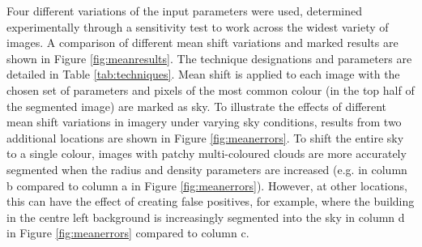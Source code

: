 \documentclass[final,3p,times,authoryear]{elsarticle}
\begin{document}
Four different variations of the input parameters were used, determined experimentally through a sensitivity test to work across the widest variety of images. A comparison of different mean shift variations and marked results are shown in Figure \ref{fig:meanresults}. The technique designations and parameters are detailed in Table \ref{tab:techniques}. Mean shift is applied to each image with the chosen set of parameters and pixels of the most common colour (in the top half of the segmented image) are marked as sky. To illustrate the effects of different mean shift variations in imagery under varying sky conditions, results from two additional locations are shown in Figure \ref{fig:meanerrors}. To shift the entire sky to a single colour, images with patchy multi-coloured clouds are more accurately segmented when the radius and density parameters are increased (e.g. in column b compared to column a in Figure \ref{fig:meanerrors}). However, at other locations, this can have the effect of creating false positives, for example, where the building in the centre left background is increasingly segmented into the sky in column d in Figure \ref{fig:meanerrors} compared to column c. 


\end{document}
